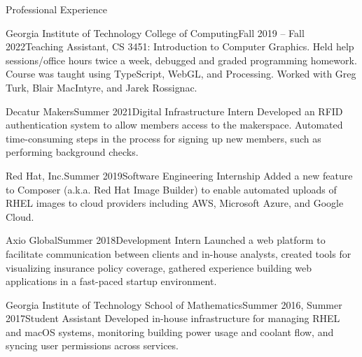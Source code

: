 \documentclass[hidelinks]{resume}
\begin{document}
\begin{rSection}{Professional Experience}
	\begin{rSubsection}{Georgia Institute of Technology College of Computing}{Fall 2019 -- Fall 2022}{Teaching Assistant, CS 3451: Introduction to Computer Graphics. }{}
		Held help sessions/office hours twice a week, debugged and graded programming homework. Course was taught using TypeScript, WebGL, and Processing. Worked with Greg Turk, Blair MacIntyre, and Jarek Rossignac.
	\end{rSubsection}
	\begin{rSubsection}{Decatur Makers}{Summer 2021}{Digital Infrastructure Intern}{}
		Developed an RFID authentication system to allow members access to the makerspace. Automated time-consuming steps in the process for signing up new members, such as performing background checks.
	\end{rSubsection}
	\begin{rSubsection}{Red Hat, Inc.}{Summer 2019}{Software Engineering Internship}{}
		Added a new feature to Composer (a.k.a. Red Hat Image Builder) to enable automated uploads of RHEL images to cloud providers including AWS, Microsoft Azure, and Google Cloud.
	\end{rSubsection}
	\begin{rSubsection}{Axio Global}{Summer 2018}{Development Intern}{}
		Launched a web platform to facilitate communication between clients and in-house analysts, created tools for visualizing insurance policy coverage, gathered experience building web applications in a fast-paced startup environment.
	\end{rSubsection}
	\begin{rSubsection}{Georgia Institute of Technology School of Mathematics}{Summer 2016, Summer 2017}{Student Assistant}{}
		Developed in-house infrastructure for managing RHEL and macOS systems, monitoring building power usage and coolant flow, and syncing user permissions across services.
	\end{rSubsection}
\end{rSection}
\end{document}
